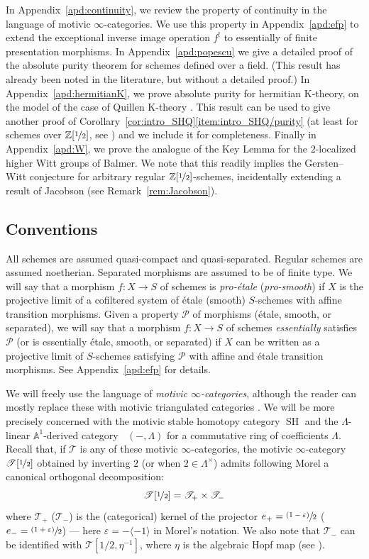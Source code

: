 \documentclass[JEP,XML,SOM,Unicode]{cedram}
\newcommand{\psfrac}[2]{\sfrac{(#1)}{#2}}
\let\epsilon\varepsilon
\newcommand{\T}{\mathscr T}
\renewcommand{\AA}{\mathbb A}
\DeclareMathOperator{\SH}{SH}
\DeclareMathOperator{\DA}{D_{\AA^1}}
\newcommand{\ZZot} {\mathbb Z[\nicefrac 1 2]}
\newcommand{\ot} {{\nicefrac 1 2}}
\theoremstyle{remark}
\theoremstyle{definition}
\numberwithin{equation}{thm}
\begin{document}
In Appendix~\ref{apd:continuity}, we review the property of continuity in the language of motivic $\infty$-categories.
We use this property in Appendix~\ref{apd:efp} to extend the exceptional inverse image operation $f^!$ to essentially of finite presentation morphisms.
In Appendix~\ref{apd:popescu} we give a detailed proof of the absolute purity theorem for schemes defined over a field. (This result has already been noted in the literature, but without a detailed proof.)
In Appendix~\ref{apd:hermitianK}, we prove absolute purity for hermitian K-theory,
on the model of the case of Quillen K-theory \cite[Th.\,13.6.3]{CD3}.
This result can be used to give another proof of Corollary~\ref{cor:intro_SHQ}\eqref{item:intro_SHQ/purity} (at least for schemes over $\ZZot$, see \cite{DFJKBorel}) and we include it for completeness.
Finally in Appendix~\ref{apd:W}, we prove the analogue of the Key Lemma for the $2$-localized higher Witt groups of Balmer.
We note that this readily implies the Gersten--Witt conjecture for arbitrary regular $\ZZot$-schemes,
incidentally extending a result of Jacobson (see Remark~\ref{rem:Jacobson}).

\subsection*{Conventions}

All schemes are assumed quasi-compact and quasi-separated.
Regular schemes are assumed noetherian.
Separated morphisms are assumed to be of finite type.
We will say that a morphism $f:X \to S$ of schemes is \emph{pro-étale} (\resp \emph{pro-smooth}) if $X$ is the projective limit of a cofiltered system of étale (\resp smooth) $S$-schemes with affine transition morphisms.
Given a property $\mathcal P$ of morphisms (\eg étale, smooth, or separated), we will say that a morphism $f:X \to S$ of schemes \emph{essentially} satisfies $\mathcal P$ (or is essentially étale, smooth, or separated) if $X$ can be written as a projective limit of $S$-schemes satisfying $\mathcal P$ with affine and étale transition morphisms.
See Appendix~\ref{apd:efp} for details.

We will freely use the language of \emph{motivic $\infty$-categories}, although the reader can mostly replace these with motivic triangulated categories \cite{CD3}.
We will be more precisely concerned with the motivic stable homotopy category $\SH$ and the $\Lambda$-linear $\AA^1$-derived category $\DA(-,\Lambda)$ for a commutative ring of coefficients $\Lambda$.
Recall that, if $\T$ is any of these motivic $\infty$-categories,
the motivic $\infty$-category $\T[\ot]$ obtained by inverting $2$ (or when $2 \in \Lambda^\times$) admits
following Morel a canonical orthogonal decomposition:
\begin{equation*}\label{eq:+-decomposition}
\T[\ot] = \T_+ \times \T_-
\end{equation*}
where $\T_+$ (\resp $\T_-$) is the (categorical) kernel of the projector
$e_+=\psfrac{1-\epsilon} 2$ (\resp $e_-=\psfrac{1+\epsilon} 2$)
--- here $\epsilon=-\langle -1\rangle$ in Morel's notation.
We also note that $\T_-$ can be identified with $\T[1/2,\eta^{-1}]$, where $\eta$ is the algebraic Hopf map (see \eg \cite[Rem.\,3.6]{ALP}).
\end{document}

